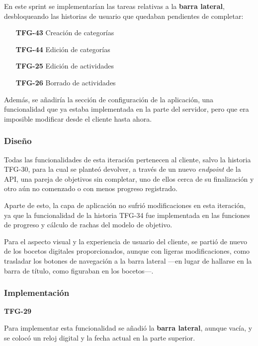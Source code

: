 \documentclass[10pt, a4paper]{aqademic}
\begin{document}
\medskip

En este sprint se implementarían las tareas relativas a la \textbf{barra lateral}, desbloqueando las historias de usuario que quedaban pendientes de completar:

\begin{itemize}[leftmargin=16mm]
	\item[\textbf{TFG-43}] Creación de categorías
	\item[\textbf{TFG-44}] Edición de categorías
	\item[\textbf{TFG-25}] Edición de actividades
	\item[\textbf{TFG-26}] Borrado de actividades
\end{itemize}

Además, se añadiría la sección de configuración de la aplicación, una funcionalidad que ya estaba implementada en la parte del servidor, pero que era imposible modificar desde el cliente hasta ahora.


\subsubsection{Diseño}

Todas las funcionalidades de esta iteración pertenecen al cliente, salvo la historia TFG-30, para la cual se planteó devolver, a través de un nuevo \textit{endpoint} de la API, una pareja de objetivos sin completar, uno de ellos cerca de su finalización y otro aún no comenzado o con menos progreso registrado.

Aparte de esto, la capa de aplicación no sufrió modificaciones en esta iteración, ya que la funcionalidad de la historia TFG-34 fue implementada en las funciones de progreso y cálculo de rachas del modelo de objetivo.

Para el aspecto visual y la experiencia de usuario del cliente, se partió de nuevo de los bocetos digitales proporcionados, aunque con ligeras modificaciones, como trasladar los botones de navegación a la barra lateral ---en lugar de hallarse en la barra de título, como figuraban en los bocetos---.


\subsubsection{Implementación}

\textbf{TFG-29}

Para implementar esta funcionalidad se añadió la \textbf{barra lateral}, aunque vacía, y se colocó un reloj digital y la fecha actual en la parte superior.
\end{document}
